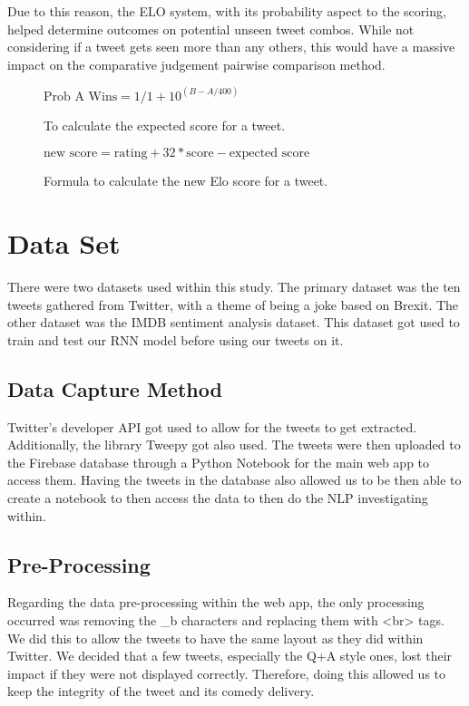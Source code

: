 	Due to this reason, the ELO system, with its probability aspect to the scoring, helped determine outcomes on potential unseen tweet combos. While not considering if a tweet gets seen more than any others, this would have a massive impact on the comparative judgement pairwise comparison method.
	
	
	\begin{figure}[h]
		\centering
		 $\text{Prob A Wins} = 1/1+10^{(B-A/400)}$
		\caption{To calculate the expected score for a tweet.}
		\label{fig:elo_maths_1}
	\end{figure}

\begin{figure}[h]
	\centering

	$\text{new score} = \text{rating} + 32 *  \text{score} - \text{expected score}$
	\caption{Formula to calculate the new Elo score for a tweet.}
	\label{fig:elo_maths_2}
\end{figure}
	
	\section{Data Set}
		There were two datasets used within this study. The primary dataset was the ten tweets gathered from Twitter, with a theme of being a joke based on Brexit. The other dataset was the IMDB sentiment analysis dataset. This dataset got used to train and test our RNN model before using our tweets on it. 
	
	\subsection{Data Capture Method}
		Twitter's developer API got used to allow for the tweets to get extracted. Additionally, the library Tweepy \cite{roesslein2020tweepy} got also used. The tweets were then uploaded to the Firebase database through a Python Notebook for the main web app to access them. Having the tweets in the database also allowed us to be then able to create a notebook to then access the data to then do the NLP investigating within.
	
	\subsection{Pre-Processing}
		Regarding the data pre-processing within the web app, the only processing occurred was removing the \_b characters and replacing them with <br> tags. We did this to allow the tweets to have the same layout as they did within Twitter. We decided that a few tweets, especially the Q+A style ones, lost their impact if they were not displayed correctly. Therefore, doing this allowed us to keep the integrity of the tweet and its comedy delivery.
	
